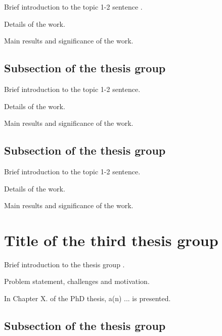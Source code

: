 \documentclass{article}
\begin{document}
Brief introduction to the topic 1-2 sentence \cite{b:isis-floodrouting}.

Details of the work.

Main results and significance of the work.

\subsection{Subsection of the thesis group}


Brief introduction to the topic 1-2 sentence.

Details of the work.

Main results and significance of the work.

\subsection{Subsection of the thesis group}


Brief introduction to the topic 1-2 sentence.

Details of the work.

Main results and significance of the work.

\section{Title of the third thesis group}

Brief introduction to the thesis group \cite{b:isis-tracking-techreport}.

Problem statement, challenges and motivation.

In Chapter X. of the PhD thesis, a(n) ... is presented.

\subsection{Subsection of the thesis group}
\end{document}
